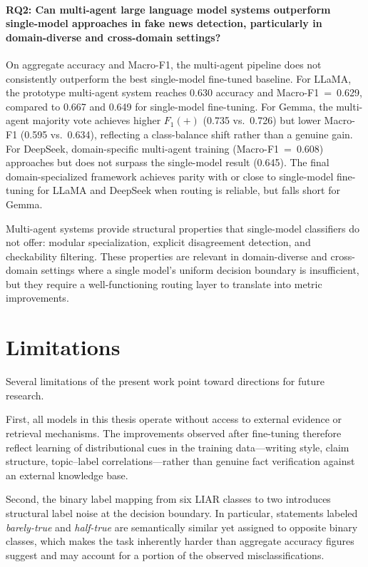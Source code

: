 \paragraph{RQ2: Can multi-agent large language model systems outperform single-model approaches in fake news detection, particularly in domain-diverse and cross-domain settings?}
On aggregate accuracy and Macro-F1, the multi-agent pipeline does not consistently outperform the best single-model fine-tuned baseline. For LLaMA, the prototype multi-agent system reaches 0.630 accuracy and Macro-F1~=~0.629, compared to 0.667 and 0.649 for single-model fine-tuning. For Gemma, the multi-agent majority vote achieves higher $F_1(+)$ (0.735 vs.\ 0.726) but lower Macro-F1 (0.595 vs.\ 0.634), reflecting a class-balance shift rather than a genuine gain. For DeepSeek, domain-specific multi-agent training (Macro-F1~=~0.608) approaches but does not surpass the single-model result (0.645). The final domain-specialized framework achieves parity with or close to single-model fine-tuning for LLaMA and DeepSeek when routing is reliable, but falls short for Gemma.

Multi-agent systems provide structural properties that single-model classifiers do not offer: modular specialization, explicit 
disagreement detection, and checkability filtering. These properties are relevant in domain-diverse and cross-domain settings where a single model's uniform decision boundary is insufficient, but they require a well-functioning routing layer to translate into metric improvements.

\section{Limitations}
\label{sec:limitations}

Several limitations of the present work point toward directions for future research. 

First, all models in this thesis operate without access to external evidence or retrieval mechanisms. The improvements observed after fine-tuning therefore reflect learning of distributional cues in the training data---writing style, claim structure, topic--label correlations---rather than genuine fact verification against an external knowledge base.

Second, the binary label mapping from six LIAR classes to two introduces structural label noise at the decision boundary. In particular, statements labeled \textit{barely-true} and \textit{half-true} are semantically similar yet assigned to opposite binary classes, which makes the task inherently harder than aggregate accuracy figures suggest and may account for a portion of the observed misclassifications.

